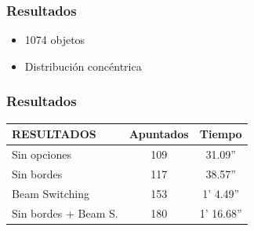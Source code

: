 \begin{frame}
    \frametitle{Resultados}
    \begin{itemize}
    \item 1074 objetos
    \item Distribución concéntrica
    \end{itemize}
    \endblock{}
		\begin{center}
		\end{center}
\end{frame}

\begin{frame}
    \frametitle{Resultados}
    {\ttfamily
\begin{tabular}{||l||c|c||}
\hline
\hline
RESULTADOS & Apuntados & Tiempo \\
\hline
\hline
Sin opciones & 109 & 31.09'' \\
\hline
Sin bordes & 117 & 38.57'' \\
\hline
Beam Switching & 153 & 1' 4.49'' \\
\hline
Sin bordes + Beam S. & 180 & 1' 16.68'' \\
\hline
\hline
\end{tabular}}
    \endblock{}
\end{frame}

